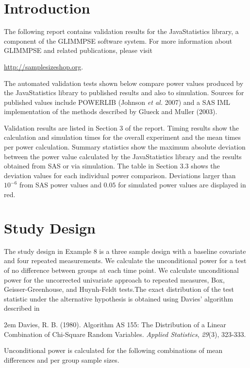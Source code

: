 \documentclass{glimmpse-report}
\begin{document}
\section{Introduction}
The following report contains validation results for the JavaStatistics library, a component of the GLIMMPSE software system.  For more information about GLIMMPSE and related publications, please visit

 

\href{http://samplesizeshop.org}{http://samplesizeshop.org}.

The automated validation tests shown below compare power values produced by the JavaStatistics library to published results and also to simulation.  Sources for published values include POWERLIB (Johnson \emph{et al.} 2007) and a SAS IML implementation of the methods described by Glueck and Muller (2003).

Validation results are listed in Section 3 of the report.  Timing results show the calculation and simulation times for the overall experiment and the mean times per power calculation.  Summary statistics show the maximum absolute deviation between the power value calculated by the JavaStatistics library and the results obtained from SAS or via simulation.  The table in Section 3.3 shows the deviation values for each individual power comparison.  Deviations larger than $10^{-6}$ from SAS power values and $0.05$ for simulated power values are displayed in red.

 \section{Study Design}
The study design in Example 8 is a three sample design with a baseline covariate and four repeated measurements.  We calculate the unconditional power for a test of no difference between groups at each time point.  We calculate unconditional power for the uncorrected univariate approach to repeated measures, Box, Geisser-Greenhouse, and Huynh-Feldt tests.The exact distribution of the test statistic under the alternative hypothesis is obtained using Davies' algorithm described in 

\hangindent2em
 Davies, R. B. (1980). Algorithm AS 155: The Distribution of a Linear Combination of Chi-Square Random Variables. \emph{Applied Statistics}, \emph{29}(3), 323-333.

Unconditional power is calculated for the following combinations of mean differences and per group sample sizes.
\end{document}
